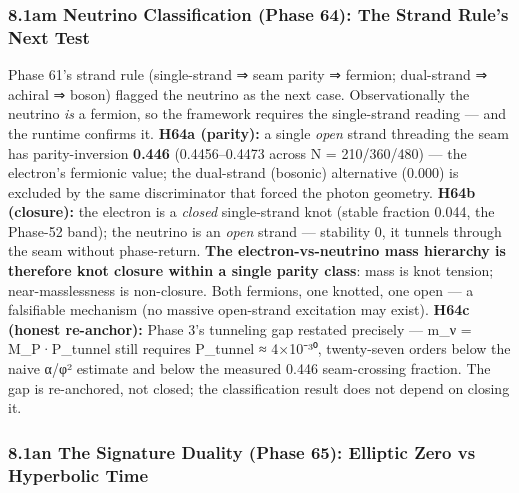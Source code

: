 \documentclass[
]{article}
\begin{document}
\subsubsection{8.1am Neutrino Classification (Phase 64): The Strand
Rule's Next
Test}\label{am-neutrino-classification-phase-64-the-strand-rules-next-test}

Phase 61's strand rule (single-strand ⇒ seam parity ⇒ fermion;
dual-strand ⇒ achiral ⇒ boson) flagged the neutrino as the next case.
Observationally the neutrino \emph{is} a fermion, so the framework
requires the single-strand reading --- and the runtime confirms it.
\textbf{H64a (parity):} a single \emph{open} strand threading the seam
has parity-inversion \textbf{0.446} (0.4456--0.4473 across N =
210/360/480) --- the electron's fermionic value; the dual-strand
(bosonic) alternative (0.000) is excluded by the same discriminator that
forced the photon geometry. \textbf{H64b (closure):} the electron is a
\emph{closed} single-strand knot (stable fraction 0.044, the Phase-52
band); the neutrino is an \emph{open} strand --- stability 0, it tunnels
through the seam without phase-return. \textbf{The electron-vs-neutrino
mass hierarchy is therefore knot closure within a single parity class}:
mass is knot tension; near-masslessness is non-closure. Both fermions,
one knotted, one open --- a falsifiable mechanism (no massive
open-strand excitation may exist). \textbf{H64c (honest re-anchor):}
Phase 3's tunneling gap restated precisely --- m\_ν = M\_P·P\_tunnel
still requires P\_tunnel ≈ 4×10⁻³⁰, twenty-seven orders below the naive
α/φ² estimate and below the measured 0.446 seam-crossing fraction. The
gap is re-anchored, not closed; the classification result does not
depend on closing it.

\subsubsection{8.1an The Signature Duality (Phase 65): Elliptic Zero vs
Hyperbolic
Time}\label{an-the-signature-duality-phase-65-elliptic-zero-vs-hyperbolic-time}
\end{document}
